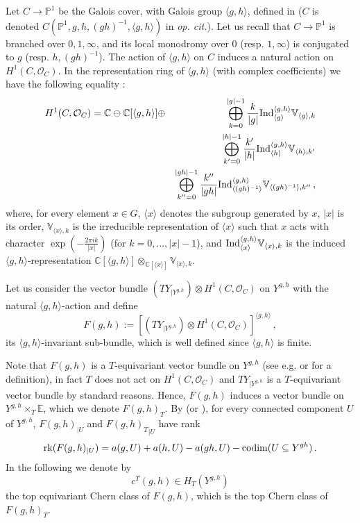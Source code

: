 \documentclass[a4paper,reqno]{amsart}
\theoremstyle{plain} %
\theoremstyle{definition} %
\theoremstyle{remark} %
\newcommand{\E}{\mathbb{E}}
\newcommand{\C}{\mathbb{C}}
\newcommand{\pr}{\mathbb{P}}   %
\newcommand{\cO}{\mathcal{O}} %
\newcommand{\1}{\mathds{1}}   %
\begin{document}
Let $C\to \pr^1$ be the Galois cover, with Galois group $\langle g, h\rangle$, defined in \cite[Appendix]{FG03}
($C$ is denoted $C(\pr^1, g, h, (gh)^{-1}, \langle g, h\rangle)$ in \textit{op. cit.}).
Let us recall that $C\to \pr^1$ is branched over $0, 1, \infty$, and its local monodromy over $0$
(resp. $1, \infty$) is conjugated to $g$ (resp. $h, (gh)^{-1}$). The action of $\langle g, h\rangle$ on $C$ induces a natural action 
on $H^1(C, \cO_C)$. In the  representation ring of $\langle g, h\rangle$ (with complex coefficients) 
we have the following equality \cite[Lemma 8.5]{JKK07}:
\begin{eqnarray}\label{l85JKK07}
H^1(C, \cO_C) = \mathbb C \ominus \C[\langle g, h\rangle] &\oplus& 
\bigoplus_{k=0}^{|g|-1}\frac{k}{|g|} {\rm Ind}^{\langle g, h\rangle}_{\langle g \rangle} \mathbb{V}_{\langle g \rangle, k} \\
&& \bigoplus_{k'=0}^{|h|-1}\frac{k'}{|h|} {\rm Ind}^{\langle g, h\rangle}_{\langle h \rangle} \mathbb{V}_{\langle h \rangle, k'} \nonumber \\
&&  \bigoplus_{k''=0}^{|gh|-1}\frac{k''}{|gh|} {\rm Ind}^{\langle g, h\rangle}_{\langle (gh)^{-1} \rangle} \mathbb{V}_{\langle (gh)^{-1} \rangle, k''} \nonumber \, ,
\end{eqnarray}
where, for every element $x \in G$, $\langle x \rangle$ denotes the subgroup generated by $x$, 
$|x|$ is its order,  $\mathbb{V}_{\langle x \rangle, k}$ is the irreducible representation of $\langle x \rangle$
such that $x$ acts with character $\exp \left( -\frac{2\pi i k}{|x|}\right)$ (for $k=0, \ldots , |x|-1$), and 
${\rm Ind}^{\langle g, h\rangle}_{\langle x \rangle} \mathbb{V}_{\langle x \rangle, k} $ is the induced 
$\langle g, h\rangle$-representation 
$\C[\langle g, h\rangle]\otimes_{\C[\langle x \rangle]} \mathbb{V}_{\langle x \rangle, k}$.

Let us consider the vector bundle $\left( TY_{|Y^{g,h}}\right) \otimes H^1(C, \cO_C)$ on $Y^{g,h}$ with the natural 
$\langle g, h\rangle$-action and define 
$$
F(g,h) := \left[ \left( TY_{|Y^{g,h}}\right) \otimes H^1(C, \cO_C)\right]^{\langle g, h\rangle} \, ,
$$
its $\langle g, h\rangle$-invariant sub-bundle, which is well defined since $\langle g, h\rangle$ is finite. 

Note that $F(g, h)$ is a $T$-equivariant vector bundle on $Y^{g,h}$ (see e.g.   
\cite[Ch. 2.3]{AF} or \cite[Prop. 3.2]{BGNX} for a definition), in fact
$T$ does not act on $H^1(C, \cO_C)$ and $TY_{|Y^{g,h}}$ is a $T$-equivariant vector bundle by standard reasons.
Hence, $F(g, h)$ induces a vector bundle on $Y^{g, h} \times_T \E$, which we denote $F(g, h)_T$. 
By \cite[Lemma 1.12]{FG03} (or \cite[Ch. 8]{JKK07}),
for every connected component $U$ of $Y^{g,h}$, $F(g,h)_{|U}$ and ${F(g,h)_T}_{|U}$ have  rank 
\begin{equation}\label{rkFgh}
{\rm rk}(F(g, h)_{|U}) =a(g, U) + a(h,U) - a(gh, U) - {\rm codim}(U\subseteq Y^{gh}) \, .
\end{equation}
In the following we denote by 
$$
c^T(g, h) \in H_T(Y^{g,h}) 
$$ 
the top equivariant Chern class of $F(g,h)$, which is the top Chern class of $F(g,h)_T$.
\end{document}
